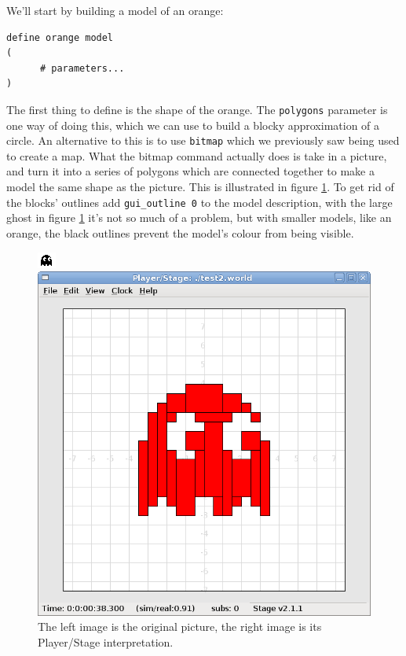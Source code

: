 \documentclass[a4paper]{article}
\newcommand{\plst}{Player/Stage\xspace}
\begin{document}
We'll start by building a model of an orange:
\begin{verbatim}
define orange model
(
      # parameters...
)
\end{verbatim}
The first thing to define is the shape of the orange. The \verb|polygons| parameter is one way of doing this, which we can use to build a blocky approximation of a circle. An alternative to this is to use \verb|bitmap| which we previously saw being used to create a map. What the bitmap command actually does is take in a picture, and turn it into a series of polygons which are connected together to make a model the same shape as the picture. This is illustrated in figure \ref{fig:ghosts}. To get rid of the blocks' outlines add \verb|gui_outline 0| to the model description, with the large ghost in figure \ref{fig:ghosts} it's not so much of a problem, but with smaller models, like an orange, the black outlines prevent the model's colour from being visible.

\begin{figure}
	\centering
	\begin{minipage}[c]{0.3\linewidth}
		\centering
		\includegraphics{./pics/oranges_box/ghost_original.png} %
		
	\end{minipage}%
	\hspace{0.05\linewidth}
	\begin{minipage}[c]{0.6\linewidth}
		\centering
		\includegraphics[width=\linewidth]{./pics/oranges_box/ghost_woutline.png} 
	\end{minipage}	
	\caption{The left image is the original picture, the right image is its \plst interpretation.}
		\label{fig:ghosts}
\end{figure}
\end{document}
